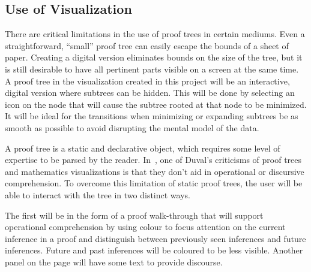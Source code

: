 \documentclass[12pt]{article}
\begin{document}





\subsection{Use of Visualization}


There are critical limitations in the use of proof trees in certain mediums. Even a straightforward, ``small'' proof tree can easily escape the bounds of a sheet of paper. Creating a digital version eliminates bounds on the size of the tree, but it is still desirable to have all pertinent parts visible on a screen at the same time. A proof tree in the visualization created in this project will be an interactive, digital version where subtrees can be hidden. This will be done by selecting an icon on the node that will cause the subtree rooted at that node to be minimized. It will be ideal for the transitions when minimizing or expanding subtrees be as smooth as possible to avoid disrupting the mental model of the data.

A proof tree is a static and declarative object, which requires some level of expertise to be parsed by the reader. In~\cite{repvisvis-duval}, one of Duval's criticisms of proof trees and mathematics visualizations is that they don't aid in operational or discursive comprehension. To overcome this limitation of static proof trees, the user will be able to interact with the tree in two distinct ways.
  
The first will be in the form of a proof walk-through that will support operational comprehension by using colour to focus attention on the current inference in a proof and distinguish between previously seen inferences and future inferences. Future and past inferences will be coloured to be less visible. Another panel on the page will have some text to provide discourse.
\end{document}
